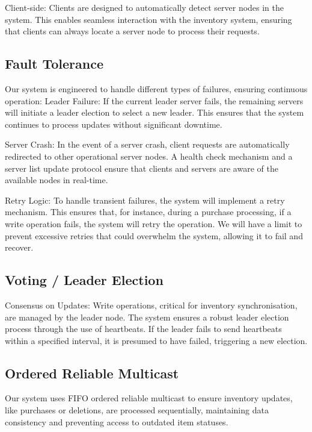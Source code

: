 \documentclass[runningheads]{llncs}
\begin{document}
Client-side: Clients are designed to automatically detect server nodes in the system. This enables seamless interaction with the inventory system, ensuring that clients can always locate a server node to process their requests.


\subsection{Fault Tolerance}

Our system is engineered to handle different types of failures, ensuring continuous operation:
Leader Failure: If the current leader server fails, the remaining servers will initiate a leader election to select a new leader. This ensures that the system continues to process updates without significant downtime.

Server Crash: In the event of a server crash, client requests are automatically redirected to other operational server nodes. A health check mechanism and a server list update protocol ensure that clients and servers are aware of the available nodes in real-time.

Retry Logic: To handle transient failures, the system will implement a retry mechanism. This ensures that, for instance, during a purchase processing, if a write operation fails, the system will retry the operation. We will have a limit to  prevent excessive retries that could overwhelm the system, allowing it to fail and recover.

\subsection{Voting / Leader Election}

Consensus on Updates: Write operations, critical for inventory synchronisation, are managed by the leader node. The system ensures a robust leader election process through the use of heartbeats. If the leader fails to send heartbeats within a specified interval, it is presumed to have failed, triggering a new election.

\subsection{Ordered Reliable Multicast}

Our system uses FIFO ordered reliable multicast to ensure inventory updates, like purchases or deletions, are processed sequentially, maintaining data consistency and preventing access to outdated item statuses.
\end{document}
